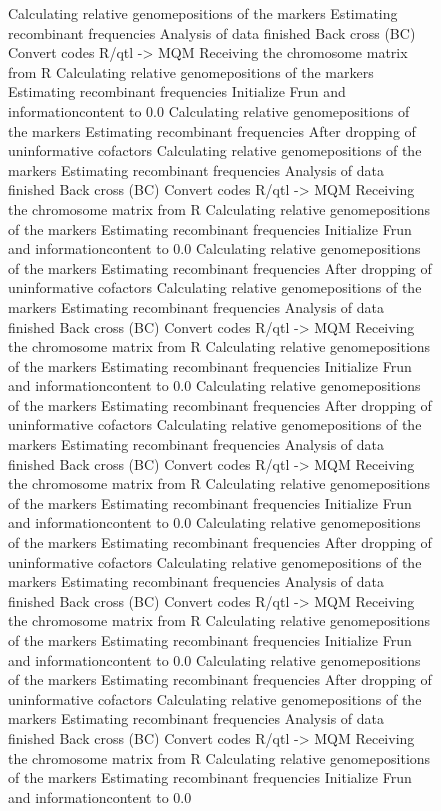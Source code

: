 \documentclass[11pt]{article}
\begin{document}
\begin{figure}[ht]
\begin{Schunk}
\begin{Soutput}
Calculating relative genomepositions of the markers
Estimating recombinant frequencies
Analysis of data finished
Back cross (BC)
Convert codes R/qtl -> MQM
Receiving the chromosome matrix from R
Calculating relative genomepositions of the markers
Estimating recombinant frequencies
Initialize Frun and informationcontent to 0.0
Calculating relative genomepositions of the markers
Estimating recombinant frequencies
After dropping of uninformative cofactors
Calculating relative genomepositions of the markers
Estimating recombinant frequencies
Analysis of data finished
Back cross (BC)
Convert codes R/qtl -> MQM
Receiving the chromosome matrix from R
Calculating relative genomepositions of the markers
Estimating recombinant frequencies
Initialize Frun and informationcontent to 0.0
Calculating relative genomepositions of the markers
Estimating recombinant frequencies
After dropping of uninformative cofactors
Calculating relative genomepositions of the markers
Estimating recombinant frequencies
Analysis of data finished
Back cross (BC)
Convert codes R/qtl -> MQM
Receiving the chromosome matrix from R
Calculating relative genomepositions of the markers
Estimating recombinant frequencies
Initialize Frun and informationcontent to 0.0
Calculating relative genomepositions of the markers
Estimating recombinant frequencies
After dropping of uninformative cofactors
Calculating relative genomepositions of the markers
Estimating recombinant frequencies
Analysis of data finished
Back cross (BC)
Convert codes R/qtl -> MQM
Receiving the chromosome matrix from R
Calculating relative genomepositions of the markers
Estimating recombinant frequencies
Initialize Frun and informationcontent to 0.0
Calculating relative genomepositions of the markers
Estimating recombinant frequencies
After dropping of uninformative cofactors
Calculating relative genomepositions of the markers
Estimating recombinant frequencies
Analysis of data finished
Back cross (BC)
Convert codes R/qtl -> MQM
Receiving the chromosome matrix from R
Calculating relative genomepositions of the markers
Estimating recombinant frequencies
Initialize Frun and informationcontent to 0.0
Calculating relative genomepositions of the markers
Estimating recombinant frequencies
After dropping of uninformative cofactors
Calculating relative genomepositions of the markers
Estimating recombinant frequencies
Analysis of data finished
Back cross (BC)
Convert codes R/qtl -> MQM
Receiving the chromosome matrix from R
Calculating relative genomepositions of the markers
Estimating recombinant frequencies
Initialize Frun and informationcontent to 0.0

\end{Soutput}
\end{Schunk}
\end{figure}
\end{document}
